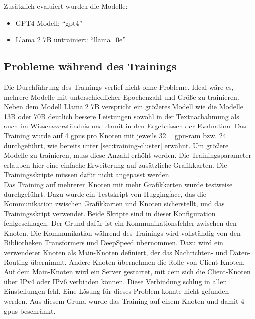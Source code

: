 Zusätzlich evaluiert wurden die Modelle:
\begin{itemize}
    \item GPT4 Modell: \enquote{gpt4}
    \item Llama 2 7B untrainiert: \enquote{llama\_$0$e}
\end{itemize}

\subsection{Probleme während des Trainings}\label{sec:problem-training}
Die Durchführung des Trainings verlief nicht ohne Probleme.
Ideal wäre es, mehrere Modelle mit unterschiedlicher Epochenzahl und Größe zu trainieren.
Neben dem Modell Llama 2 7B verspricht ein größeres Modell wie die Modelle 13B oder 70B deutlich bessere Leistungen sowohl in der Textnachahmung als auch im Wissensverständnis und damit in den Ergebnissen der Evaluation.
Das Training wurde auf 4 \ac{gpu}s pro Knoten mit jeweils \SI{32}{\giga\byte} \ac{gpu}-\ac{ram} bzw. \SI{24}{\giga\byte} durchgeführt, wie bereits unter \cref{sec:training-cluster} erwähnt.
Um größere Modelle zu trainieren, muss diese Anzahl erhöht werden.
Die Trainingsparameter erlauben hier eine einfache Erweiterung auf zusätzliche Grafikkarten.
Die Trainingsskripte müssen dafür nicht angepasst werden.\\

Das Training auf mehreren Knoten mit mehr Grafikkarten wurde testweise durchgeführt.
Dazu wurde ein Testskript von Huggingface, das die Kommunikation zwischen Grafikkarten und Knoten sicherstellt, und das Trainingsskript verwendet.
Beide Skripte sind in dieser Konfiguration fehlgeschlagen.
Der Grund dafür ist ein Kommunikationsfehler zwischen den Knoten.
Die Kommunikation während des Trainings wird vollständig von den Bibliotheken Transformers und DeepSpeed übernommen.
Dazu wird ein verwendeter Knoten als Main-Knoten definiert, der das Nachrichten- und Daten-Routing übernimmt.
Andere Knoten übernehmen die Rolle von Client-Knoten.
Auf dem Main-Knoten wird ein Server gestartet, mit dem sich die Client-Knoten über IPv4 oder IPv6 verbinden können.
Diese Verbindung schlug in allen Einstellungen fehl.
Eine Lösung für dieses Problem konnte nicht gefunden werden.
Aus diesem Grund wurde das Training auf einem Knoten und damit 4 \ac{gpu}s beschränkt.\\

